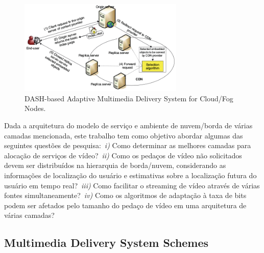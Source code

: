 
\vspace{0.8cm}
\begin{figure}[htpb]
	\centering
	\includegraphics[width=0.7\textwidth]{img/fig-intro.png}
	\caption{DASH-based Adaptive Multimedia Delivery System for Cloud/Fog Nodes.}
	\label{fig:scenario-arch}
\end{figure}

Dada a arquitetura do modelo de serviço e ambiente de nuvem/borda de várias camadas mencionada, este trabalho tem como objetivo abordar algumas das seguintes questões de pesquisa:~\textit{i)} Como determinar as melhores camadas para alocação de serviços de vídeo?~\textit{ii)} Como os pedaços de vídeo não solicitados devem ser distribuídos na hierarquia de borda/nuvem, considerando as informações de localização do usuário e estimativas sobre a localização futura do usuário em tempo real?~\textit{iii)} Como facilitar o streaming de vídeo através de várias fontes simultaneamente?~\textit{iv)} Como os algoritmos de adaptação à taxa de bits podem ser afetados pelo tamanho do pedaço de vídeo em uma arquitetura de várias camadas?

\subsection{Multimedia Delivery System Schemes}

